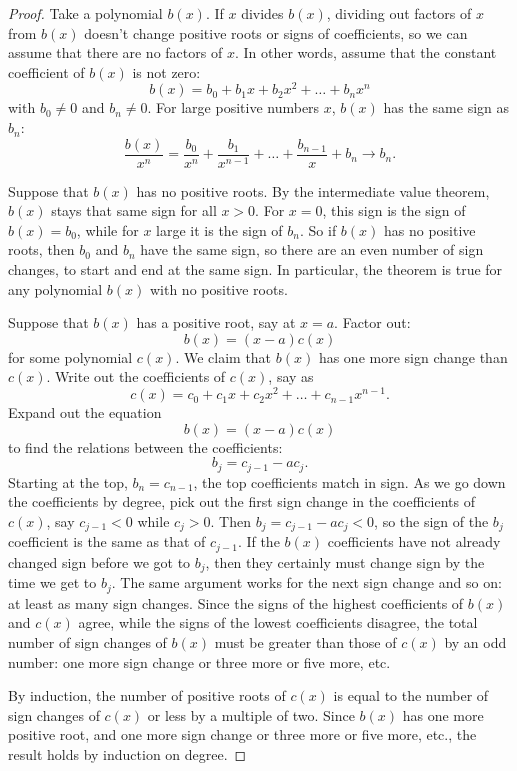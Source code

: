\begin{proof}
Take a polynomial \(b(x)\).
If \(x\) divides \(b(x)\), dividing out factors of \(x\) from \(b(x)\) doesn't change positive roots or signs of coefficients, so we can assume that there are no factors of \(x\).
In other words, assume that the constant coefficient of \(b(x)\) is not zero:
\[
b(x)=b_0+b_1x+b_2x^2+\dots+b_n x^n
\] 
with \(b_0 \ne 0\) and \(b_n \ne 0\).
For large positive numbers \(x\), \(b(x)\) has the same sign as \(b_n\):
\[
\frac{b(x)}{x^n}
=
\frac{b_0}{x^n} + \frac{b_1}{x^{n-1}} + \dots + \frac{b_{n-1}}{x} + b_n \to b_n.
\]

Suppose that \(b(x)\) has no positive roots.
By the intermediate value theorem, \(b(x)\) stays that same sign for all \(x>0\).
For \(x=0\), this sign is the sign of \(b(x)=b_0\), while for \(x\) large it is the sign of \(b_n\).
So if \(b(x)\) has no positive roots, then \(b_0\) and \(b_n\) have the same sign, so there are an even number of sign changes, to start and end at the same sign.
In particular, the theorem is true for any polynomial \(b(x)\) with no positive roots.

Suppose that \(b(x)\) has a positive root, say at \(x=a\).
Factor out:
\[
b(x)=(x-a)c(x)
\]
for some polynomial \(c(x)\).
We claim that \(b(x)\) has one more sign change than \(c(x)\).
Write out the coefficients of \(c(x)\), say as
\[
c(x)=c_0+c_1x+c_2x^2+\dots+c_{n-1} x^{n-1}.
\]
Expand out the equation
\[
b(x)=(x-a)c(x)
\]
to find the relations between the coefficients:
\[
b_j = c_{j-1}-ac_j.
\]
Starting at the top, \(b_n=c_{n-1}\), the top coefficients match in sign.
As we go down the coefficients by degree, pick out the first sign change in the coefficients of \(c(x)\), say \(c_{j-1}<0\) while \(c_j>0\).
Then \(b_j=c_{j-1}-ac_j<0\), so the sign of the \(b_j\) coefficient is the same as that of \(c_{j-1}\).
If the \(b(x)\) coefficients have not already changed sign before we got to \(b_j\), then they certainly must change sign by the time we get to \(b_j\).
The same argument works for the next sign change and so on: at least as many sign changes.
Since the signs of the highest coefficients of \(b(x)\) and \(c(x)\) agree, while the signs of the lowest coefficients disagree, the total number of sign changes of \(b(x)\) must be greater than those of \(c(x)\) by an odd number: one more sign change or three more or five more, etc.

By induction, the number of positive roots of \(c(x)\) is equal to the number of sign changes of \(c(x)\) or less by a multiple of two.
Since \(b(x)\) has one more positive root, and one more sign change or three more or five more, etc., the result holds by induction on degree.
\end{proof}


